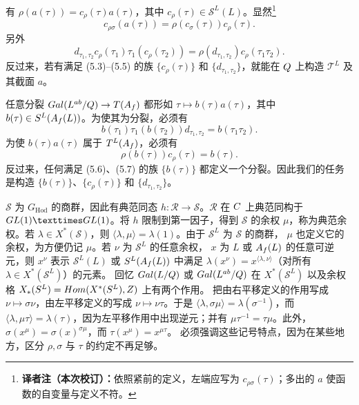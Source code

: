 有 $\rho(a(\tau))=c_\rho(\tau)a(\tau)$，其中
$c_\rho(\tau)\in\mathcal S^L(L)$。显然\footnote{\textbf{译者注（本次校订）：}依照紧前的定义，左端应写为 $c_{\rho\sigma}(\tau)$；多出的 $a$ 使函数的自变量与定义不符。}
\begin{equation}
c_{\rho\sigma}(a(\tau))=\rho(c_\sigma(\tau))c_\rho(\tau).\tag{5.4}
\end{equation}
另外
\begin{equation}
d_{\tau_1,\tau_2}c_\rho(\tau_1)\tau_1(c_\rho(\tau_2))
=\rho(d_{\tau_1,\tau_2})c_\rho(\tau_1\tau_2).\tag{5.5}
\end{equation}
反过来，若有满足 (5.3)--(5.5) 的族 $\{c_\rho(\tau)\}$ 和
$\{d_{\tau_1,\tau_2}\}$，就能在 $Q$ 上构造 $\mathcal T^L$ 及其截面 $a$。

任意分裂 $Gal(L^{ab}/Q)\to T(A_f)$ 都形如
$\tau\mapsto b(\tau)a(\tau)$，其中 $b(\tau)\in S^L(A_f(L))$。为使其为分裂，必须有
\begin{equation}
b(\tau_1)\tau_1(b(\tau_2))d_{\tau_1,\tau_2}=b(\tau_1\tau_2).\tag{5.6}
\end{equation}
为使 $b(\tau)a(\tau)$ 属于 $T^L(A_f)$，必须有
\begin{equation}
\rho(b(\tau))c_\rho(\tau)=b(\tau).\tag{5.7}
\end{equation}
反过来，任何满足 (5.6)、(5.7) 的族 $\{b(\tau)\}$ 都定义一个分裂。因此我们的任务是构造
$\{b(\tau)\}$、$\{c_\rho(\tau)\}$ 和 $\{d_{\tau_1,\tau_2}\}$。

$\mathcal S$ 为 $G_{\operatorname{Hod}}$ 的商群，因此有典范同态
$h:\mathcal R\to\mathcal S$。$\mathcal R$ 在 $C$ 上典范同构于
$\GL(1)\times\GL(1)$。将 $h$ 限制到第一因子，得到 $\mathcal S$ 的余权
$\mu$，称为典范余权。若 $\lambda\in X^*(\mathcal S)$，则
$\langle\lambda,\mu\rangle=\lambda(1)$。由于 $\mathcal S^L$ 为 $\mathcal S$ 的商群，
$\mu$ 也定义它的余权，为方便仍记 $\mu$。若 $\nu$ 为 $\mathcal S^L$ 的任意余权，
$x$ 为 $L$ 或 $A_f(L)$ 的任意可逆元，则 $x^\nu$ 表示
$\mathcal S^L(L)$ 或 $S^L(A_f(L))$ 中满足
$\lambda(x^\nu)=x^{\langle\lambda,\nu\rangle}$（对所有 $\lambda\in X^*(\mathcal S^L)$）的元素。
回忆 $Gal(L/Q)$ 或 $Gal(L^{ab}/Q)$ 在
$X^*(\mathcal S^L)$ 以及余权格
$X_*(S^L)=Hom(X^*(S^L),Z)$ 上有两个作用。
把由右平移定义的作用写成 $\nu\mapsto\sigma\nu$，由左平移定义的写成
$\nu\mapsto\nu\tau$。于是
$\langle\lambda,\sigma\mu\rangle=\lambda(\sigma^{-1})$，而
$\langle\lambda,\mu\tau\rangle=\lambda(\tau)$，因为左平移作用中出现逆元；并有
$\mu\tau^{-1}=\tau\mu$。此外，
$\sigma(x^\mu)=\sigma(x)^{\sigma\mu}$，而 $\tau(x^\mu)=x^{\mu\tau}$。
必须强调这些记号特点，因为在某些地方，区分 $\rho,\sigma$ 与 $\tau$ 的约定不再足够。

